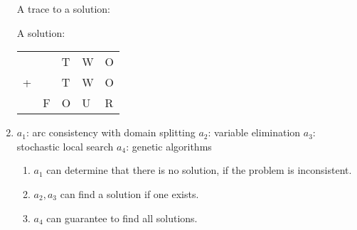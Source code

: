 \documentclass{article}
\begin{document}
\begin{enumerate}
A trace to a solution:


A solution: 
\begin{table}[h]
\centering
\begin{tabular}{lllll}
  &   & T & W & O \\
+ &   & T & W & O \\ \hline
  & F & O & U & R
\end{tabular}
\end{table}



\item
$a_1$: arc consistency with domain splitting
$a_2$: variable elimination
$a_3$: stochastic local search
$a_4$: genetic algorithms

\begin{enumerate}
\item $a_1$ can determine that there is no solution, if the problem is inconsistent.
\item $a_2,a_3$ can find a solution if one exists.
\item $a_4$ can guarantee to find all solutions.
\end{enumerate}



\end{enumerate}
\end{document}
